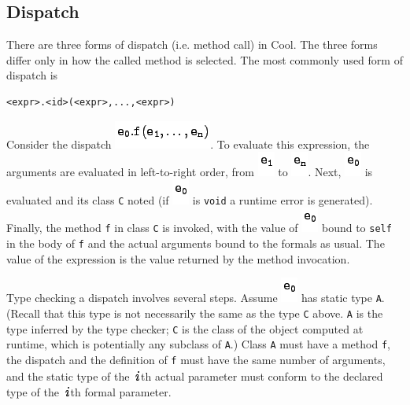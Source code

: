 \documentclass[]{article}
\begin{document}
\subsection{Dispatch}

There are three forms of dispatch (i.e. method call) in Cool. The three
forms differ only in how the called method is selected. The most
commonly used form of dispatch is

\begin{verbatim}
<expr>.<id>(<expr>,...,<expr>)
\end{verbatim}

Consider the dispatch \includegraphics{img16.png}. To evaluate this
expression, the arguments are evaluated in left-to-right order, from
\includegraphics{img17.png} to \includegraphics{img18.png}. Next,
\includegraphics{img19.png} is evaluated and its class \texttt{C} noted
(if \includegraphics{img19.png} is \texttt{void} a runtime error is
generated). Finally, the method \texttt{f} in class \texttt{C} is
invoked, with the value of \includegraphics{img19.png} bound to
\texttt{self} in the body of \texttt{f} and the actual arguments bound
to the formals as usual. The value of the expression is the value
returned by the method invocation.

Type checking a dispatch involves several steps. Assume
\includegraphics{img19.png} has static type \texttt{A}. (Recall that
this type is not necessarily the same as the type \texttt{C} above.
\texttt{A} is the type inferred by the type checker; \texttt{C} is the
class of the object computed at runtime, which is potentially any
subclass of \texttt{A}.) Class \texttt{A} must have a method \texttt{f},
the dispatch and the definition of \texttt{f} must have the same number
of arguments, and the static type of the \includegraphics{img20.png}th
actual parameter must conform to the declared type of the
\includegraphics{img20.png}th formal parameter.
\end{document}
